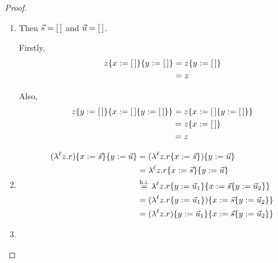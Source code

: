 \begin{proof}
\begin{enumerate}
\item {}
Then $\vec{s} = [\,]$ and $\vec{u} = [\,]$.

Firstly,
\begin{equation*}\begin{split}
  z\{x := [\,]\}\{y := [\,]\}
                   & = z\{y := [\,]\} \\
                   & = z \\
\end{split}\end{equation*}

Also,
\begin{equation*}\begin{split}
  z\{y := [\,]\}\{x := [\,]\{y := [\,]\}\}
                   & = z\{x := [\,]\{y := [\,]\}\} \\
                   & = z\{x := [\,]\} \\
                   & = z \\
\end{split}\end{equation*}

\item {}
\begin{equation*}\begin{split}
  (\lambda^{\ell} z. r)\{x := \vec{s}\}\{y := \vec{u}\}
     & = (\lambda^{\ell} z. r\{x := \vec{s}\})\{y := \vec{u}\} \\
     & = \lambda^{\ell} z. r\{x := \vec{s}\}\{y := \vec{u}\} \\
     & \overset{\mathrm{h.i.}}{=} \lambda^{\ell} z. r\{y := \vec{u}_1\}\{x := \vec{s}\{y := \vec{u}_2\}\} \\
     & = (\lambda^{\ell} z. r\{y := \vec{u}_1\})\{x := \vec{s}\{y := \vec{u}_2\}\} \\
     & = (\lambda^{\ell} z. r)\{y := \vec{u}_1\}\{x := \vec{s}\{y := \vec{u}_2\}\} \\
\end{split}\end{equation*}
\item {}


\end{enumerate}
\end{proof}
